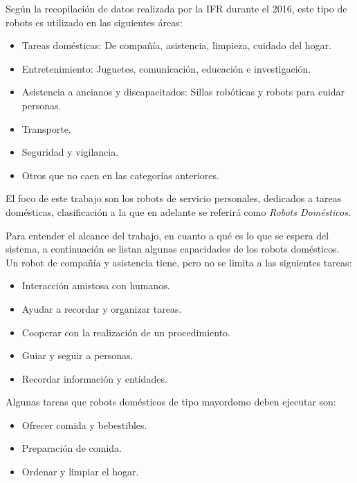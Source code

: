 Según la recopilación de datos realizada por la IFR durante el 2016, este tipo de robots es utilizado en las siguientes áreas:
\begin{itemize}[topsep=0pt]
\setlength\itemsep{0.2em}
\item Tareas domésticas: De compañía, asistencia, limpieza, cuidado del hogar.
\item Entretenimiento: Juguetes, comunicación, educación e investigación.
\item Asistencia a ancianos y discapacitados: Sillas robóticas y robots para cuidar personas.
\item Transporte.
\item Seguridad y vigilancia.
\item Otros que no caen en las categorías anteriores.
\end{itemize}
\bigskip

El foco de este trabajo son los robots de servicio personales, dedicados a tareas domésticas, clasificación a la que en  adelante se referirá como \textit{Robots Domésticos}.

Para entender el alcance del trabajo, en cuanto a qué es lo que se espera del sistema, a continuación se listan algunas capacidades de los robots domésticos. Un robot de compañía y asistencia tiene, pero no se limita a las siguientes tareas:
\begin{itemize}[topsep=0pt]
\setlength\itemsep{0.2em}
\item Interacción amistosa con humanos.
\item Ayudar a recordar y organizar tareas.
\item Cooperar con la realización de un procedimiento.
\item Guiar y seguir a personas.
\item Recordar información y entidades.
\end{itemize}
\bigskip

Algunas tareas que robots domésticos de tipo mayordomo deben ejecutar son:
\begin{itemize}[topsep=0pt]
\setlength\itemsep{0.2em}
\item Ofrecer comida y bebestibles.
\item Preparación de comida.
\item Ordenar y limpiar el hogar.
\end{itemize}
\bigskip



